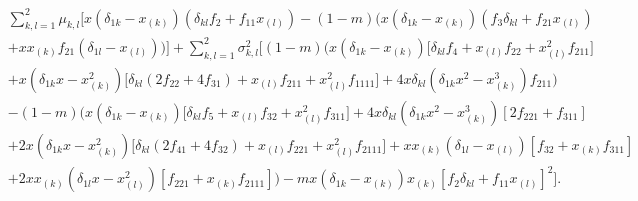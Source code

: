 \documentclass[11pt]{article}
\begin{document}
\begin{align}\label{AA-eq7}
& \sum_{k,l=1}^{2}\mu_{k,l}\Bigg[
x\left(\delta_{1k}-x_{(k)}\right)\left(\delta_{kl}f_{2}+f_{11}x_{(l)}\right)-
(1-m)\Big(x\left(\delta_{1k}-x_{(k)}\right)\left(f_{3}\delta_{kl}+f_{21}x_{(l)}\right)\nonumber\\
&+xx_{(k)}f_{21}\left(\delta_{1l}-x_{(l)}\right)\Big)\Bigg]+\sum_{k,l=1}^{2}\sigma^2_{k,l}\Bigg[(1-m)\Big(
x\left(\delta_{1k}-x_{(k)}\right)\Big[\delta_{kl}f_{4}+x_{(l)}f_{22}+x^2_{(l)}f_{211}\Big]\nonumber&\\
&+x(\delta_{1k}x-x_{(k)}^2)\Big[\delta_{kl}\left(2f_{22}+4f_{31}\right)+x_{(l)}f_{211}+x^2_{(l)}f_{1111}\Big]+4x\delta_{kl}(\delta_{1k}x^2-x_{(k)}^3)f_{211}\Big)\nonumber\\
&-(1-m)\Big(
x\left(\delta_{1k}-x_{(k)}\right)\Big[\delta_{kl}f_{5}+x_{(l)}f_{32}+x_{(l)}^2f_{311}\Big] +4x\delta_{kl}(\delta_{1k}x^2-x_{(k)}^3)[2f_{221}+f_{311}] \nonumber&\\
&+2x(\delta_{1k}x-x_{(k)}^2)\Big[\delta_{kl}\left(2f_{41}+4f_{32}\right)+x_{(l)}f_{221}
+x_{(l)}^2f_{2111}\Big]+xx_{(k)}(\delta_{1l}-x_{(l)})[f_{32}+x_{(k)}f_{311}]\nonumber\\
&+2xx_{(k)}(\delta_{1l}x-x_{(l)}^2)[f_{221}+x_{(k)}f_{2111}]
\Big) -mx\left(\delta_{1k}-x_{(k)}\right)x_{(k)}\left[f_{2}\delta_{kl}+f_{11}x_{(l)}\right]^2
\Bigg].
\end{align}
\end{document}
